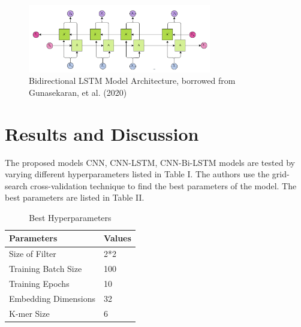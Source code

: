 \documentclass[journal]{IEEEtran}
\begin{document}
    \begin{figure}
      \centering
      \includegraphics[width=8cm]{figures/bi_lstm_cell.png}
      \caption{Bidirectional LSTM Model Architecture, borrowed from Gunasekaran, et al. (2020)}
    \end{figure}

\section{Results and Discussion}
  The proposed models CNN, CNN-LSTM, CNN-Bi-LSTM models are tested by varying different hyperparameters listed in Table I. 
  The authors use the grid-search cross-validation technique to find the best parameters of the model.
  The best parameters are listed in Table II.

  \begin{table}
    \caption{\label{tab:table2}Best Hyperparameters}
    \centering
      \begin{tabular}{ || l l ||}
      \hline
      Parameters & Values \\ 
      \hline
      \hline
      Size of Filter       & 2*2 \\  
      Training Batch Size  & 100 \\
      Training Epochs      & 10  \\
      Embedding Dimensions & 32  \\
      K-mer Size           & 6   \\
      \hline
      \end{tabular}%
  \end{table}
\end{document}
